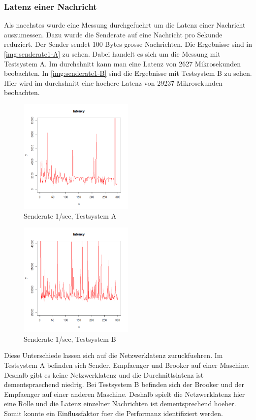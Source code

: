 

\subsubsection{Latenz einer Nachricht}
Als naechstes wurde eine Messung durchgefuehrt um die Latenz einer Nachricht auszumessen. Dazu wurde die Senderate auf eine Nachricht pro Sekunde reduziert. Der Sender sendet 100 Bytes grosse Nachrichten. 
Die Ergebnisse sind in \autoref{img:senderate1-A} zu sehen. Dabei handelt es sich um die Messung mit Testsystem A. Im durchshnitt kann man eine Latenz von 2627 Mikrosekunden beobachten. In \autoref{img:senderate1-B} sind die Ergebnisse mit Testsystem B zu sehen. Hier wird im durchshnitt eine hoehere Latenz von 29237 Mikrosekunden beobachten. 
\begin{figure}
\center
  \includegraphics[width=0.5\textwidth]{images/ratelimit1.png}
  \caption{Senderate 1/sec, Testsystem A}
  \label{img:senderate1-A}
\end{figure}
\begin{figure}
\center
  \includegraphics[width=0.5\textwidth]{images/ratelimit1-A.png}
  \caption{Senderate 1/sec, Testsystem B}
  \label{img:senderate1-B}
\end{figure}
Diese Unterschiede lassen sich auf die Netzwerklatenz zuruckfuehren. Im Testsystem A befinden sich Sender, Empfaenger und Brooker auf einer Maschine. Deshalb gibt es keine Netzwerklatenz und die Durchnittslatenz ist dementspraechend niedrig. Bei Testsystem B befinden sich der Brooker und der Empfaenger auf einer anderen Maschine. Deshalb spielt die Netzwerklatenz hier eine Rolle und die Latenz einzelner Nachrichten ist dementsprechend hoeher. Somit konnte ein Einflussfaktor fuer die Performanz identifiziert werden. 

